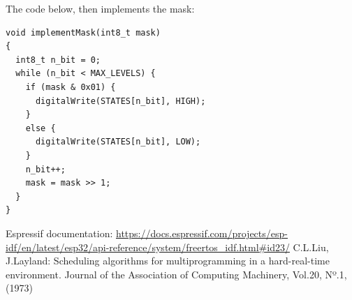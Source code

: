 \documentclass[11pt]{article}
\begin{document}
The code below, then implements the mask:

\begin{verbatim}
void implementMask(int8_t mask)
{
  int8_t n_bit = 0;
  while (n_bit < MAX_LEVELS) {
    if (mask & 0x01) {
      digitalWrite(STATES[n_bit], HIGH);
    }
    else {
      digitalWrite(STATES[n_bit], LOW);
    }
    n_bit++;
    mask = mask >> 1;
  }
}
\end{verbatim}

\newpage
\begin{thebibliography}{8}

 Espressif documentation: {\url{https://docs.espressif.com/projects/esp-idf/en/latest/esp32/api-reference/system/freertos_idf.html#id23/}}
  C.L.Liu, J.Layland: Scheduling algorithms for multiprogramming in a hard-real-time environment. Journal of the Association of Computing Machinery, Vol.20, Nº.1, (1973)

\end{thebibliography}
\end{document}
